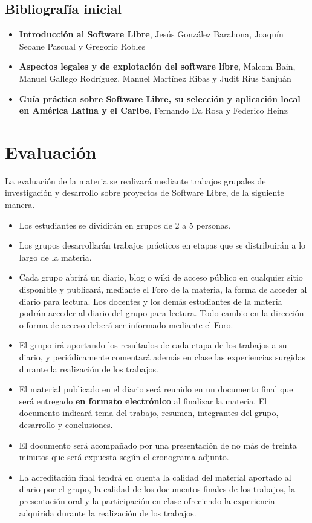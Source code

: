 \subsection {Bibliografía inicial}
\begin{itemize}
	\item \textbf{Introducción al Software Libre}, Jesús González Barahona, Joaquín Seoane Pascual y Gregorio Robles
	\item \textbf{Aspectos legales y de explotación del software libre}, Malcom Bain, Manuel Gallego Rodríguez, Manuel Martínez Ribas y Judit Rius Sanjuán
	\item \textbf{Guía práctica sobre Software Libre, su selección y aplicación local en América Latina y el Caribe}, Fernando Da Rosa y Federico Heinz
\end{itemize}



\section{Evaluación}
La evaluación de la materia se realizará mediante trabajos grupales de investigación y desarrollo sobre proyectos de Software Libre, de la siguiente manera.
\begin{itemize}
	\item Los estudiantes se dividirán en grupos de 2 a 5 personas. 
	\item Los grupos desarrollarán trabajos prácticos en etapas que se distribuirán a lo largo de la materia. 
	\item Cada grupo abrirá un diario, blog o wiki de acceso público en cualquier sitio disponible y publicará, mediante el Foro de la materia, la forma de acceder al diario para lectura. Los docentes y los demás estudiantes de la materia podrán acceder al diario del grupo para lectura. Todo cambio en la dirección o forma de acceso deberá ser informado mediante el Foro.
	\item El grupo irá aportando los resultados de cada etapa de los trabajos a su diario, y periódicamente comentará además en clase las experiencias surgidas durante la realización de los trabajos.
	\item El material publicado en el diario será reunido en un documento final que será entregado \textbf{en formato electrónico} al finalizar la materia. El documento indicará tema del trabajo, resumen, integrantes del grupo, desarrollo y conclusiones. 
	\item El documento será acompañado por una presentación de no más de treinta minutos que será expuesta según el cronograma adjunto. 
	\item La acreditación final tendrá en cuenta la calidad del material aportado al diario por el grupo, la calidad de los documentos finales de los trabajos, la presentación oral y la participación en clase ofreciendo la experiencia adquirida durante la realización de los trabajos.
\end{itemize}

